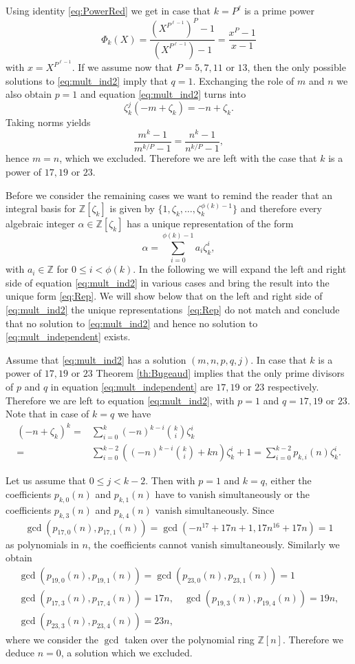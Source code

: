 \documentclass{amsart}
\theoremstyle{plain}
\numberwithin{equation}{section}
\theoremstyle{remark}
\begin{document}
Using identity \eqref{eq:PowerRed} we get in case that $k=P^\ell$ is a prime power
\[\Phi_{k}(X)=\frac{\left(X^{P^{\ell-1}}\right)^P -1}{\left(X^{P^{\ell-1}}\right)-1}=\frac{x^P-1}{x-1}\]
with $x=X^{P^{\ell -1}}$. If we assume now that $P=5,7,11$ or $13$,
then the only possible solutions to \eqref{eq:mult_ind2} imply that
$q=1$. Exchanging the role of $m$ and $n$ we also obtain $p=1$ and
equation \eqref{eq:mult_ind2} turns into
$$\zeta_k^j(-m+\zeta_k)=-n+\zeta_k.$$
Taking norms yields
$$\frac{m^k-1}{m^{k/P}-1}=\frac{n^k-1}{n^{k/P}-1},$$
hence $m=n$, which we excluded. Therefore we are left with the case
that $k$ is a power of $17,19$ or $23$.

Before we consider the remaining cases we want to remind the reader
that an integral basis for ${{\mathbb Z}}[\zeta_k]$ is given by
$\{1,\zeta_k,\ldots,\zeta_k^{\phi(k)-1}\}$ and therefore every
algebraic integer $\alpha\in{{\mathbb Z}}[\zeta_k]$ has a unique representation
of the form
\begin{equation}\label{eq:Rep}
\alpha=\sum_{i=0}^{\phi(k)-1} a_i\zeta_k^i, 
\end{equation}
with $a_i\in{{\mathbb Z}}$ for $0\leq i<\phi(k)$. In the following we will expand
the left and right side of equation \eqref{eq:mult_ind2} in various
cases and bring the result into the unique form \eqref{eq:Rep}. We will
show below that on the left and right side of \eqref{eq:mult_ind2} the
unique representations~\eqref{eq:Rep} do not match and conclude that
no solution to \eqref{eq:mult_ind2} and hence no solution to
\eqref{eq:mult_independent} exists.

Assume that \eqref{eq:mult_ind2} has a solution $(m,n,p,q,j)$. In case that $k$ is a power of $17,19$ or $23$ Theorem \ref{th:Bugeaud} implies that the only 
prime divisors of $p$ and $q$ in equation \eqref{eq:mult_independent} are $17,19$ 
or $23$ respectively. Therefore we are left to equation \eqref{eq:mult_ind2}, with $p=1$ and $q=17,19$ or $23$. Note that in case of $k=q$ we have
\begin{align*}
(-n+\zeta_k)^k=&\sum_{i=0}^{k} (-n)^{k-i}\binom{k}{i} \zeta_k^{i}\\
=&\sum_{i=0}^{k-2} \left((-n)^{k-i}\binom{k}{i}+kn\right)\zeta_k^i +1=\sum_{i=0}^{k-2} p_{k,i}(n)\zeta_k^i.
\end{align*}

Let us assume that $0\leq j< k-2$. Then with $p=1$ and $k=q$, either the coefficients $p_{k,0}(n)$ and 
$p_{k,1}(n)$ have to 
vanish simultaneously or the coefficients  $p_{k,3}(n)$ and $p_{k,4}(n)$ vanish simultaneously. Since
\[\gcd(p_{17,0}(n),p_{17,1}(n))=\gcd(-n^{17} + 17 n + 1, 17 n^{16} + 17 n)=1 \]
as polynomials in $n$, the coefficients cannot vanish simultaneously. Similarly we obtain
\begin{gather*}
\gcd(p_{19,0}(n),p_{19,1}(n))=\gcd(p_{23,0}(n),p_{23,1}(n))=1\\
\gcd(p_{17,3}(n),p_{17,4}(n))=17n, \quad \gcd(p_{19,3}(n),p_{19,4}(n))=19n,\\
\gcd(p_{23,3}(n),p_{23,4}(n))=23n,
\end{gather*}
where we consider the $\gcd$ taken over the polynomial ring ${{\mathbb Z}}[n]$. Therefore we deduce $n=0$, a solution which we excluded.
\end{document}

